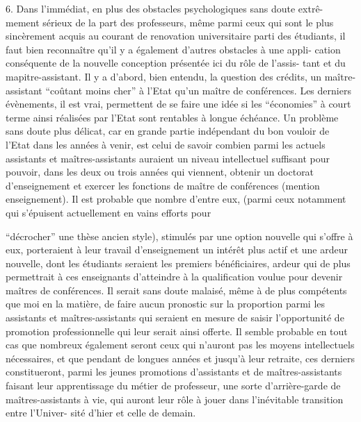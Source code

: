 \documentclass[11pt]{article}
\newcommand{\scanpage}[1]{\par\bigskip\noindent{\small\sffamily[scan #1]}\par}
\newcommand{\mspage}[1]{{\small\sffamily[p.\,#1]}}
\newcommand{\hand}[1]{\textcolor{blue}{#1}}
\begin{document}
6. Dans l'immédiat, en plus des obstacles psychologiques sans doute extrê-%
mement sérieux de la part des professeurs, même parmi ceux qui sont le plus
sincèrement acquis au courant de renovation universitaire parti des étudiants,
il faut bien reconnaître qu'il y a également d'autres obstacles à une appli-%
cation conséquente de la nouvelle conception présentée ici du rôle de l'assis-%
tant et du mapitre-assistant. Il y a d'abord, bien entendu, la question des
crédits, un maître-assistant ``coûtant moins cher'' à l'Etat qu'un maître de
conférences. Les derniers évènements, il est vrai, permettent de se faire une
idée si les ``économies'' à court terme ainsi réalisées par l'Etat sont rentables
à longue échéance. Un problème sans doute plus délicat, car en grande partie
indépendant du bon vouloir de l'Etat dans les années à venir, est celui de
savoir combien parmi les actuels assistants et maîtres-assistants auraient un
niveau intellectuel suffisant pour pouvoir, dans les deux ou trois années qui
viennent, obtenir un doctorat d'enseignement et exercer les fonctions de
maître de conférences (mention enseignement). Il est probable que nombre d'entre
eux, (parmi ceux notamment qui s'épuisent actuellement en vains efforts pour

\mspage{\hand{267}}

\clearpage
\scanpage{119/268}
\mspage{15}

``décrocher'' une thèse ancien style), stimulés par une option nouvelle qui
s'offre à eux, porteraient à leur travail d'enseignement un intérêt plus actif
et une ardeur nouvelle, dont les étudiants seraient les premiers bénéficiaires,
ardeur qui de plus permettrait à ces enseignants d'atteindre à la qualification
voulue pour devenir maîtres de conférences. Il serait sans doute malaisé,
même à de plus compétents que moi en la matière, de faire aucun pronostic sur
la proportion parmi les assistants et maîtres-assistants qui seraient en mesure
de saisir l'opportunité de promotion professionnelle qui leur serait ainsi
offerte. Il semble probable en tout cas que nombreux également seront ceux
qui n'auront pas les moyens intellectuels nécessaires, et que pendant de longues
années et jusqu'à leur retraite, ces derniers constitueront, parmi les jeunes
promotions d'assistants et de maîtres-assistants faisant leur apprentissage
du métier de professeur, une sorte d'arrière-garde de maîtres-assistants à
vie, qui auront leur rôle à jouer dans l'inévitable transition entre l'Univer-%
sité d'hier et celle de demain.
\end{document}
